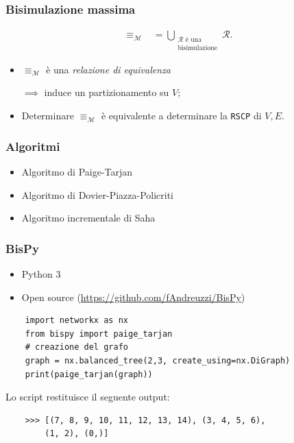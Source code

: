 \documentclass{beamer}
\begin{document}
\begin{frame}
    \frametitle{Bisimulazione massima}


    \begin{gather*}
        \equiv_\mathcal{M} \,\,\,\,\,= \bigcup_{\substack{\mathcal{R} \text{ è una}\\\text{bisimulazione}}} \mathcal{R}.
    \end{gather*}

    \begin{itemize}
        \item $\equiv_\mathcal{M}$ è una \emph{relazione di equivalenza}

        $\implies$ induce un partizionamento su $V$;
        \item Determinare $\equiv_\mathcal{M}$ è equivalente a determinare la \texttt{RSCP} di $V,E$.
    \end{itemize}
\end{frame}

\begin{frame}
    \frametitle{Algoritmi}
    \begin{itemize}
        \item Algoritmo di Paige-Tarjan
        \item Algoritmo di Dovier-Piazza-Policriti
        \item Algoritmo incrementale di Saha
    \end{itemize}
\end{frame}

\begin{frame}[fragile]
    \frametitle{BisPy}
    \begin{itemize}
        \item Python 3
        \item Open source (\url{https://github.com/fAndreuzzi/BisPy})
    \end{itemize}

    \begin{verbatim}
    import networkx as nx
    from bispy import paige_tarjan
    # creazione del grafo
    graph = nx.balanced_tree(2,3, create_using=nx.DiGraph)
    print(paige_tarjan(graph))
    \end{verbatim}
    Lo script restituisce il seguente output:
    \begin{verbatim}
    >>> [(7, 8, 9, 10, 11, 12, 13, 14), (3, 4, 5, 6),
        (1, 2), (0,)]
    \end{verbatim}
\end{frame}
\end{document}
